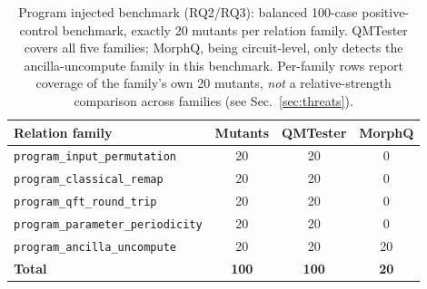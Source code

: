 \begin{table}[t]
\centering
\caption{Program injected benchmark (RQ2/RQ3): balanced 100-case positive-control benchmark, exactly 20 mutants per relation family. QMTester covers all five families; MorphQ, being circuit-level, only detects the ancilla-uncompute family in this benchmark. Per-family rows report coverage of the family's own 20 mutants, \emph{not} a relative-strength comparison across families (see Sec.~\ref{sec:threats}).}
\label{tab:program-injected}
\scriptsize
\setlength{\tabcolsep}{4pt}
\begin{tabular}{@{}p{}ccc@{}}
\toprule
\textbf{Relation family} & \textbf{Mutants} & \textbf{QMTester} & \textbf{MorphQ} \\
\midrule
\texttt{program\_input\_permutation}    & 20 & 20 & 0 \\
\texttt{program\_classical\_remap}      & 20 & 20 & 0 \\
\texttt{program\_qft\_round\_trip}      & 20 & 20 & 0 \\
\texttt{program\_parameter\_periodicity}& 20 & 20 & 0 \\
\texttt{program\_ancilla\_uncompute}    & 20 & 20 & 20 \\
\midrule
\textbf{Total} & \textbf{100} & \textbf{100} & \textbf{20} \\
\bottomrule
\end{tabular}
\end{table}
